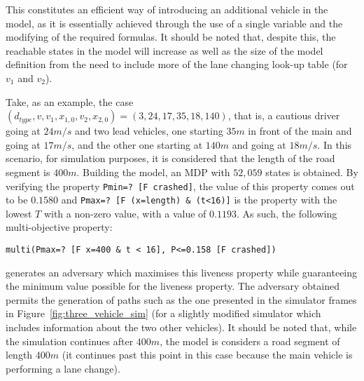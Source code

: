 This constitutes an efficient way of introducing an additional vehicle in the model, as it is essentially achieved through the use of a single variable and the modifying of the required formulas. It should be noted that, despite this, the reachable states in the model will increase as well as the size of the model definition from the need to include more of the lane changing look-up table (for $v_1$ and $v_2$). 

Take, as an example, the case $(d_{type}, v, v_1, x_{1,0}, v_2, x_{2,0}) = (3, 24, 17, 35, 18, 140)$, that is, a cautious driver going at $24m/s$ and two lead vehicles, one starting $35m$ in front of the main and going at $17m/s$, and the other one starting at $140m$ and going at $18m/s$. In this scenario, for simulation purposes, it is considered that the length of the road segment is $400m$. Building the model, an MDP with $52,059$ states is obtained. By verifying the property \texttt{Pmin=? [F crashed]}, the value of this property comes out to be $0.1580$ and \texttt{Pmax=? [F (x=length) \& (t<16)]} is the property with the lowest $T$ with a non-zero value, with a value of $0.1193$. As such, the following multi-objective property:

\begin{minipage}{\linewidth}
{\vspace{1em}
\begin{lstlisting}
multi(Pmax=? [F x=400 & t < 16], P<=0.158 [F crashed])
\end{lstlisting}
}
\end{minipage}

generates an adversary which maximises this liveness property while guaranteeing the minimum value possible for the liveness property. The adversary obtained permits the generation of paths such as the one presented in the simulator frames in Figure~\ref{fig:three_vehicle_sim} (for a slightly modified simulator which includes information about the two other vehicles). It should be noted that, while the simulation continues after $400m$, the model is considers a road segment of length $400m$ (it continues past this point in this case because the main vehicle is performing a lane change).

